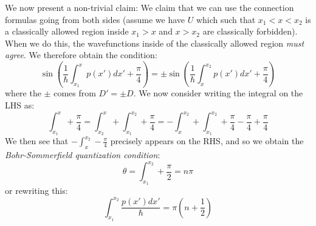 We now present a non-trivial claim: We claim that we can use the connection formulas going from both sides (assume we have $U$ which such that $x_1 < x < x_2$ is a classically allowed region inside $x_1 > x$ and $x > x_2$ are classically forbidden). When we do this, the wavefunctions inside of the classically allowed region \emph{must agree}. We therefore obtain the condition:
\begin{equation}
    \sin\left(\frac{1}{\hbar}\int_{x_1}^{x} p(x')dx' + \frac{\pi}{4}\right) = \pm \sin\left(\frac{1}{\hbar}\int_{x}^{x_2} p(x')dx' + \frac{\pi}{4}\right)
\end{equation}
where the $\pm$ comes from $D' = \pm D$. We now consider writing the integral on the LHS as:
\begin{equation}
    \int_{x_1}^x + \frac{\pi}{4} = \int_{x_2}^x  + \int_{x_1}^{x_2} + \frac{\pi}{4} = -\int_{x}^{x_2} + \int_{x_1}^{x_2} + \frac{\pi}{4} - \frac{\pi}{4} + \frac{\pi}{4}
\end{equation}
We then see that $-\int_{x}^{x_2} - \frac{\pi}{4}$ precisely appears on the RHS, and so we obtain the \emph{Bohr-Sommerfield quantization condition}:
\begin{equation}
    \theta = \int_{x_1}^{x_2} + \frac{\pi}{2} = n\pi
\end{equation}
or rewriting this:
\begin{equation}
    \boxed{\int_{x_1}^{x_2}\frac{p(x')dx'}{\hbar} = \pi(n + \frac{1}{2})}
\end{equation}

